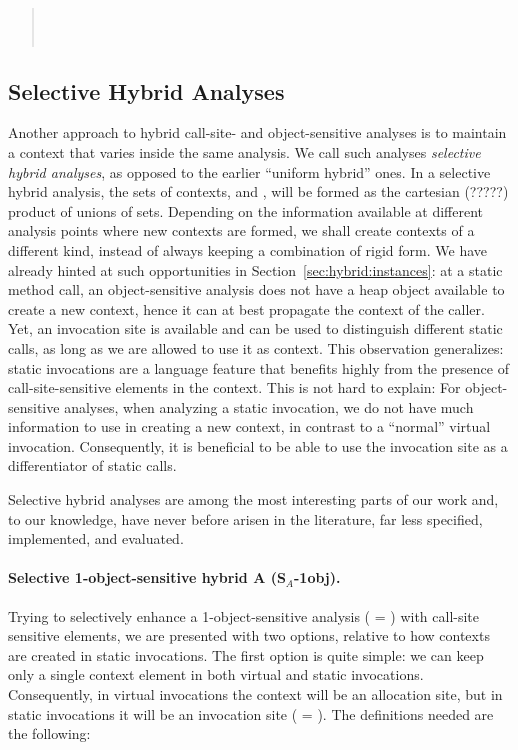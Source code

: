 \begin{quote}
 \\
 \\
\end{quote}


\subsection{Selective Hybrid Analyses}

Another approach to hybrid call-site- and object-sensitive analyses is to maintain a context that varies inside the same analysis. We call such analyses \emph{selective hybrid analyses}, as opposed to the earlier ``uniform hybrid'' ones. In a selective hybrid analysis, the sets of contexts,  and , will be formed as the cartesian (?????) product of unions of sets. Depending on the information available at different analysis points where new contexts are formed, we shall create contexts of a different kind, instead of always keeping a combination of rigid form. We have already hinted at such opportunities in Section~\ref{sec:hybrid:instances}: at a static method call, an object-sensitive analysis does not have a heap object available to create a new context, hence it can at best propagate the context of the caller. Yet, an invocation site is available and can be used to distinguish different static calls, as long as we are allowed to use it as context. This observation generalizes: static invocations are a language feature that benefits highly from the presence of call-site-sensitive elements in the context. This is not hard to explain: For object-sensitive analyses, when analyzing a static invocation, we do not have much information to use in creating a new context, in contrast to a ``normal'' virtual invocation. Consequently, it is beneficial to be able to use the invocation site as a differentiator of static calls.

Selective hybrid analyses are among the most interesting parts of our work and, to our knowledge, have never before arisen in the literature, far less specified, implemented, and evaluated.

\paragraph{Selective 1-object-sensitive hybrid A (S$_A$-1obj).}
Trying to selectively enhance a 1-object-sensitive analysis ( = \args{\{$\star$\}}) with call-site sensitive elements, we are presented with two options, relative to how contexts are created in static invocations. The first option is quite simple: we can keep only a single context element in both virtual and static invocations. Consequently, in virtual invocations the context will be an allocation site, but in static invocations it will be an invocation site ( = ). The definitions needed are the following:

